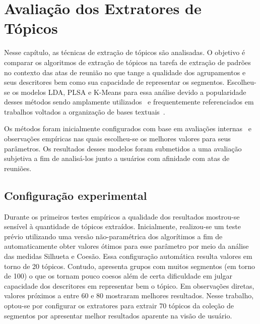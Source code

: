 \chapter{Avaliação dos Extratores de Tópicos}\label{cap-extratores}





% 

Nesse capítulo, as técnicas de extração de tópicos são analisadas. O objetivo é comparar os algoritmos de extração de tópicos na tarefa de extração de padrões no contexto das atas de reunião no que tange a qualidade dos agrupamentos e seus descritores bem como sua capacidade de representar os segmentos. Escolheu-se os modelos LDA, PLSA e K-Means para essa análise devido a popularidade desses métodos sendo amplamente utilizados~\cite{DZhu20122} e frequentemente referenciados em trabalhos voltados a organização de bases textuais~\cite{Aggarwal2018, OCallaghan2015, Steyvers2007}.


Os métodos foram inicialmente configurados com base em avaliações internas~\cite{Hassani2017} e observações empíricas nas quais escolheu-se os melhores valores para seus parâmetros. Os resultados desses modelos foram submetidos a uma avaliação subjetiva a fim de analisá-los junto a usuários com afinidade com atas de reuniões.







\section{Configuração experimental}

Durante os primeiros testes empíricos a qualidade dos resultados mostrou-se sensível à quantidade de tópicos extraídos.
Inicialmente, realizou-se um teste prévio utilizando uma versão não-paramétrica dos algorítimos a fim de automaticamente obter valores ótimos para esse parâmetro por meio da análise das medidas Silhueta e Coesão. Essa configuração automática resulta valores em torno de 20 tópicos. Contudo, apresenta grupos com muitos segmentos (em torno de 100) o que os tornam pouco coesos além de certa dificuldade em julgar capacidade dos descritores em representar bem o tópico.  
Em observações diretas, valores próximos a entre 60 e 80 mostraram melhores resultados. Nesse trabalho, optou-se por configurar os extratores para extrair 70 tópicos da coleção de segmentos por apresentar melhor resultados aparente na visão de usuário.


